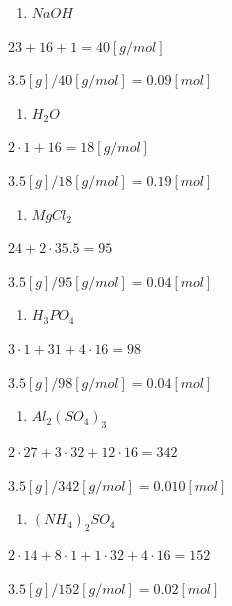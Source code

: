 \documentclass[
  11pt,
  a4paper,
  openany]{book}
\providecommand{\tightlist}{%
  \setlength{\itemsep}{0pt}\setlength{\parskip}{0pt}}
\begin{document}
\begin{Answer}

\begin{multicols}{2}

\begin{enumerate}
\def\labelenumi{\arabic{enumi}.}
\tightlist
\item
  \(NaOH\)
\end{enumerate}

\(23 + 16 + 1 = 40 [g/mol]\)

\(3.5 [g] / 40 [g/mol] = 0.09 [mol]\)

\begin{enumerate}
\def\labelenumi{\arabic{enumi}.}
\setcounter{enumi}{1}
\tightlist
\item
  \(H_2O\)
\end{enumerate}

\(2 \cdot 1 + 16 = 18 [g/mol]\)

\(3.5 [g] / 18 [g/mol] = 0.19 [mol]\)

\begin{enumerate}
\def\labelenumi{\arabic{enumi}.}
\setcounter{enumi}{2}
\tightlist
\item
  \(MgCl_2\)
\end{enumerate}

\(24 + 2 \cdot 35.5 = 95\)

\(3.5 [g] / 95 [g/mol] = 0.04 [mol]\)

\begin{enumerate}
\def\labelenumi{\arabic{enumi}.}
\setcounter{enumi}{3}
\tightlist
\item
  \(H_3PO_4\)
\end{enumerate}

\(3 \cdot 1 + 31 + 4 \cdot 16 = 98\)

\(3.5 [g] / 98 [g/mol] = 0.04 [mol]\)

\begin{enumerate}
\def\labelenumi{\arabic{enumi}.}
\setcounter{enumi}{4}
\tightlist
\item
  \(Al_2(SO_4)_3\)
\end{enumerate}

\(2 \cdot 27 + 3 \cdot 32 + 12 \cdot 16 = 342\)

\(3.5 [g] / 342 [g/mol] = 0.010 [mol]\)

\begin{enumerate}
\def\labelenumi{\arabic{enumi}.}
\setcounter{enumi}{5}
\tightlist
\item
  \((NH_4)_2SO_4\)
\end{enumerate}

\(2 \cdot 14 + 8 \cdot 1 + 1 \cdot 32 + 4 \cdot 16 = 152\)

\(3.5 [g] / 152 [g/mol] = 0.02 [mol]\)

\end{multicols}

\end{Answer}
\end{document}
